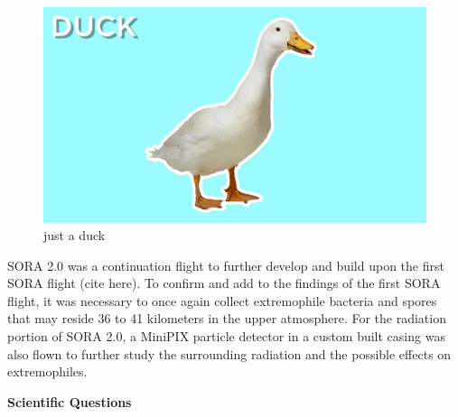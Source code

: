 \begin{figure}[h!]
  \begin{center}
      \includegraphics[width=\textwidth]{./figures/duck.jpg}
      \caption{just a duck}
      \label{fig:duck}
  \end{center}
\end{figure}

SORA 2.0 was a continuation flight to further develop and build upon the first SORA flight (cite here).  To confirm and add to the findings of the first SORA flight, it was necessary to once again collect extremophile bacteria and spores that may reside 36 to 41 kilometers in the upper atmosphere.  For the radiation portion of SORA 2.0, a MiniPIX particle detector in a custom built casing was also flown to further study the surrounding radiation and the possible effects on extremophiles.  

 
{\bf Scientific Questions}

